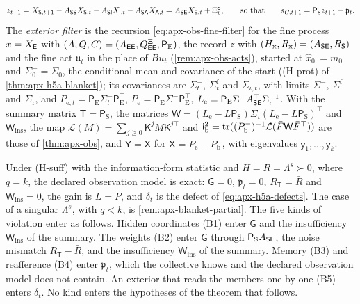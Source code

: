 \begin{definition}
\begin{equation}\label{eq:apx-blanket-record}
z_{t+1}=X_{\mathsf{S},t+1}-A_{\mathsf{S}\mathsf{S}}X_{\mathsf{S},t}-A_{\mathsf{S}\mathsf{I}}X_{\mathsf{I},t}-A_{\mathsf{S}\mathsf{A}}X_{\mathsf{A},t}=A_{\mathsf{S}\mathsf{E}}X_{\mathsf{E},t}+\Xi^{\mathsf{S}}_t,\qquad\text{so that}\qquad s_{C,t+1}=\mathsf P_{\mathrm S}z_{t+1}+\mathfrak p_t .
\end{equation}
The \emph{exterior filter} is the recursion \eqref{eq:apx-obs-fine-filter} for the fine process $x=X_{\mathsf{E}}$ with $(A,Q,C)=(A_{\mathsf{E}\mathsf{E}},Q^{\Xi}_{\mathsf{E}\mathsf{E}},\mathsf P_{\mathrm E})$, the record $z$ with $(H_{\mathrm x},R_{\mathrm x})=(A_{\mathsf{S}\mathsf{E}},R_{\mathsf{S}})$ and the fine act $\mathfrak u_t$ in the place of $Bu_t$ (\cref{rem:apx-obs-acts}), started at $\hat x^-_0=m_0$ and $\Sigma^-_0=\Sigma_0$, the conditional mean and covariance of the start ((H-prot) of \cref{thm:apx-h5a-blanket}); its covariances are $\Sigma^-_t$, $\Sigma^{\mathrm f}_t$ and $\Sigma_{\iota,t}$, with limits $\Sigma^-$, $\Sigma^{\mathrm f}$ and $\Sigma_\iota$, and $P_{\mathrm e,t}=\mathsf P_{\mathrm E}\Sigma^-_t\mathsf P_{\mathrm E}^\top$, $P_{\mathrm e}=\mathsf P_{\mathrm E}\Sigma^-\mathsf P_{\mathrm E}^\top$, $L_{\mathrm e}=\mathsf P_{\mathrm E}\Sigma^-A_{\mathsf{S}\mathsf{E}}^\top\Sigma_\iota^{-1}$. With the summary matrix $\mathsf T=\mathsf P_{\mathrm S}$, the matrices $\mathsf W=(L_{\mathrm e}-L\mathsf P_{\mathrm S})\Sigma_\iota(L_{\mathrm e}-L\mathsf P_{\mathrm S})^\top$ and $\mathsf W_{\mathrm{ins}}$, the map $\mathcal L(M)=\sum_{j\ge0}\mathsf K^jM\mathsf K^{j\top}$ and $\mathsf i_{\mathrm b}^2=\operatorname{tr}((P^-_{\mathrm b})^{-1}\mathcal L(\bar F\mathsf W\bar F^\top))$ are those of \cref{thm:apx-obs}, and $\mathsf Y=\tilde{\mathsf X}$ for $\mathsf X=P_{\mathrm e}-P^-_{\mathrm b}$, with eigenvalues $\mathsf y_1,\dots,\mathsf y_k$.
\end{definition}

Under (H-suff) with the information-form statistic and $\bar H=\bar R=\Lambda^s\succ0$, where $q=k$, the declared observation model is exact: $\mathsf G=0$, $\mathfrak p_t=0$, $R_{\mathsf T}=\bar R$ and $\mathsf W_{\mathrm{ins}}=0$, the gain is $L=\bar P$, and $\delta_t$ is the defect of \eqref{eq:apx-h5a-defects}. The case of a singular $\Lambda^s$, with $q<k$, is \cref{rem:apx-blanket-partial}. The five kinds of violation enter as follows. Hidden coordinates (B1) enter $\mathsf G$ and the insufficiency $\mathsf W_{\mathrm{ins}}$ of the summary. The weights (B2) enter $\mathsf G$ through $\mathsf P_{\mathrm S}A_{\mathsf{S}\mathsf{E}}$, the noise mismatch $R_{\mathsf T}-\bar R$, and the insufficiency $\mathsf W_{\mathrm{ins}}$ of the summary. Memory (B3) and reafference (B4) enter $\mathfrak p_t$, which the collective knows and the declared observation model does not contain. An exterior that reads the members one by one (B5) enters $\delta_t$. No kind enters the hypotheses of the theorem that follows.

